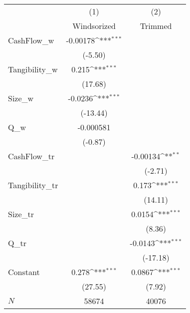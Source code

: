 {
\def\sym#1{\ifmmode^{#1}\else\(^{#1}\)\fi}
\begin{tabular}{l*{2}{c}}
\hline\hline
            &\multicolumn{1}{c}{(1)}         &\multicolumn{1}{c}{(2)}         \\
            & Windsorized         &     Trimmed         \\
\hline
CashFlow\_w  &    -0.00178\sym{***}&                     \\
            &     (-5.50)         &                     \\
Tangibility\_w&       0.215\sym{***}&                     \\
            &     (17.68)         &                     \\
Size\_w      &     -0.0236\sym{***}&                     \\
            &    (-13.44)         &                     \\
Q\_w         &   -0.000581         &                     \\
            &     (-0.87)         &                     \\
CashFlow\_tr &                     &    -0.00134\sym{**} \\
            &                     &     (-2.71)         \\
Tangibility\_tr&                     &       0.173\sym{***}\\
            &                     &     (14.11)         \\
Size\_tr     &                     &      0.0154\sym{***}\\
            &                     &      (8.36)         \\
Q\_tr        &                     &     -0.0143\sym{***}\\
            &                     &    (-17.18)         \\
Constant    &       0.278\sym{***}&      0.0867\sym{***}\\
            &     (27.55)         &      (7.92)         \\
\hline
\(N\)       &       58674         &       40076         \\
\hline\hline
\end{tabular}
}
